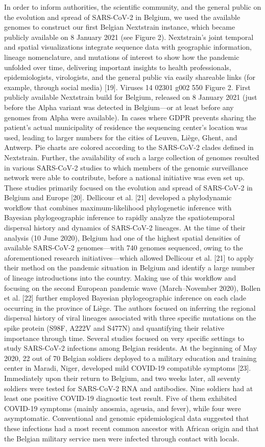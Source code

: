 In order to inform authorities, the scientific community, and the general public on the evolution and spread of SARS-CoV-2 in Belgium, we used the available genomes to construct our first Belgian Nextstrain instance, which became publicly available on 8 January 2021 (see Figure 2). Nextstrain’s joint temporal and spatial visualizations integrate sequence data with geographic information, lineage nomenclature, and mutations of interest to show how the pandemic unfolded over time, delivering important insights to health professionals, epidemiologists, virologists, and the general public via easily shareable links (for example, through social media) [19].
Viruses 14 02301 g002 550
Figure 2. First publicly available Nextstrain build for Belgium, released on 8 January 2021 (just before the Alpha variant was detected in Belgium—or at least before any genomes from Alpha were available). In cases where GDPR prevents sharing the patient’s actual municipality of residence the sequencing center’s location was used, leading to larger numbers for the cities of Leuven, Liège, Ghent, and Antwerp. Pie charts are colored according to the SARS-CoV-2 clades defined in Nextstrain.
Further, the availability of such a large collection of genomes resulted in various SARS-CoV-2 studies to which members of the genomic surveillance network were able to contribute, before a national initiative was even set up. These studies primarily focused on the evolution and spread of SARS-CoV-2 in Belgium and Europe [20]. Dellicour et al. [21] developed a phylodynamic workflow that combines maximum-likelihood phylogenetic inference with Bayesian phylogeographic inference to rapidly analyze the spatiotemporal dispersal history and dynamics of SARS-CoV-2 lineages. At the time of their analysis (10 June 2020), Belgium had one of the highest spatial densities of available SARS-CoV-2 genomes—with 740 genomes sequenced, owing to the aforementioned research initiatives—which allowed Dellicour et al. [21] to apply their method on the pandemic situation in Belgium and identify a large number of lineage introductions into the country. Making use of this workflow and focusing on the second European pandemic wave (March–November 2020), Bollen et al. [22] further employed Bayesian phylogeographic inference on each clade occurring in the province of Liège. The authors focused on inferring the regional dispersal history of viral lineages associated with three specific mutations on the spike protein (S98F, A222V and S477N) and quantifying their relative importance through time.
Several studies focused on very specific settings to study SARS-CoV-2 infections among Belgian residents. At the beginning of May 2020, 22 out of 70 Belgian soldiers deployed to a military education and training center in Maradi, Niger, developed mild COVID-19 compatible symptoms [23]. Immediately upon their return to Belgium, and two weeks later, all seventy soldiers were tested for SARS-CoV-2 RNA and antibodies. Nine soldiers had at least one positive COVID-19 diagnostic test result. Five of them exhibited COVID-19 symptoms (mainly anosmia, ageusia, and fever), while four were asymptomatic. Conventional and genomic epidemiological data suggested that these infections had a most recent common ancestor with African origin and that the Belgian military service men were infected through contact with locals.
